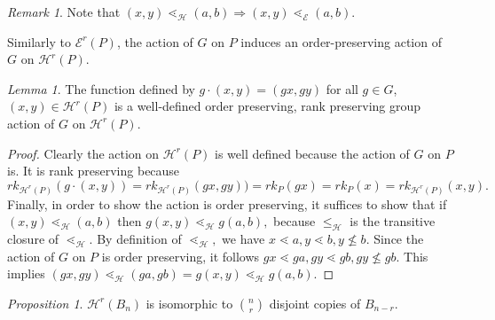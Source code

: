\documentclass[10 pt]{amsart}
\theoremstyle{plain}
\theoremstyle{definition}
\theoremstyle{remark}
\numberwithin{equation}{section}
\newtheorem{lem}[thm]{Lemma}
\newtheorem{prop}[thm]{Proposition}
\theoremstyle{remark}
\newtheorem{rem}[thm]{Remark}
\begin{document}
\begin{rem}\label{rem:order_containment}
Note that $(x, y)\lessdot_{\mathcal{H}} (a, b) \Rightarrow (x, y)\lessdot_{\mathcal E} (a, b)$.
\end{rem}

Similarly to $\mathcal E^r(P)$, the action of $G$ on $P$ induces an order-preserving action of $G$ on $\mathcal{H}^r(P)$.

\begin{lem}
\label{lem:G_action_on_HP}
The function defined by $g\cdot (x, y)= (gx, gy)$ for all $g\in G$, $(x, y)\in \mathcal{H}^r(P)$ is a well-defined order preserving, rank preserving group action of $G$ on $\mathcal{H}^r(P)$.
\end{lem}

\begin{proof}
Clearly the action on $\mathcal H^r(P)$ is well defined because the action of $G$ on $P$ is. It is rank preserving because $$rk_{\mathcal H^r(P)}(g\cdot(x, y)) = rk_{\mathcal H^r(P)}(gx, gy)) = rk_P(gx)=rk_P(x) = rk_{\mathcal H^r(P)}(x, y).$$
Finally, in order to show the action is order preserving, it suffices to show that if $(x, y) \lessdot_{\mathcal H} (a, b)$ then $g(x, y) \lessdot_{\mathcal H} g(a, b),$ because $\leq_{\mathcal H}$ is the transitive closure of $\lessdot_{\mathcal H}.$ By definition of $\lessdot_{\mathcal H},$ we have $x \lessdot a,y\lessdot b,y \not \leq b.$ Since the action of $G$ on $P$ is order preserving, it follows $gx \lessdot ga,gy \lessdot gb, gy \not \leq gb.$ This implies $(gx, gy) \lessdot_{\mathcal H} (ga, gb) = g(x, y) \lessdot_{\mathcal H} g(a , b).$
\end{proof}

\begin{prop}\label{prop:computing_HBn}
$\mathcal{H}^r(B_n)$ is isomorphic to $\binom{n}{r}$ disjoint copies of $B_{n-r}$.
\end{prop}
\end{document}
